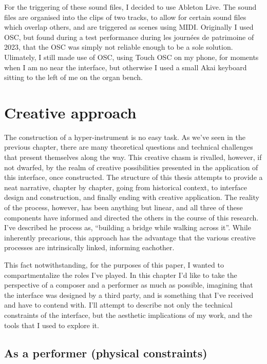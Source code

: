 \documentclass[12pt,twoside,maitrise]{dms_ks}
\theoremstyle{definition}
\begin{document}
For the triggering of these sound files, I decided to use Ableton Live. 
The sound files are organised into the clips of two tracks, to allow for certain sound files which overlap others, and are triggered as scenes using MIDI. 
Originally I used OSC, but found during a test performance during les journées de patrimoine of 2023, that the OSC was simply not reliable enough to be a sole solution. 
Ulimately, I still made use of OSC, using Touch OSC on my phone, for moments when I am no near the interface, but otherwise I used a small Akai keyboard sitting to the left of me on the organ bench.

\chapter{Creative approach}

The construction of a hyper-instrument is no easy task.
As we've seen in the previous chapter, there are many theoretical questions and technical challenges that present themselves along the way.
This creative chasm is rivalled, however, if not dwarfed, by the realm of creative possibilities presented in the application of this interface, once constructed.
The structure of this thesis attempts to provide a neat narrative, chapter by chapter, going from historical context, to interface design and construction, and finally ending with creative application.
The reality of the process, however, has been anything but linear, and all three of these components have informed and directed the others in the course of this research.
I’ve described he process as, “building a bridge while walking across it”.
While inherently precarious, this approach has the advantage that the various creative processes are intrinsically linked, informing eachother.

This fact notwithstanding, for the purposes of this paper, I wanted to compartmentalize the roles I’ve played.
In this chapter I’d like to take the perspective of a composer and a performer as much as possible, imagining that the interface was designed by a third party, and is something that I’ve received and have to contend with.
I’ll attempt to describe not only the technical constraints of the interface, but the aesthetic implications of my work, and the tools that I used to explore it.

\section{As a performer (physical constraints)}
\end{document}
